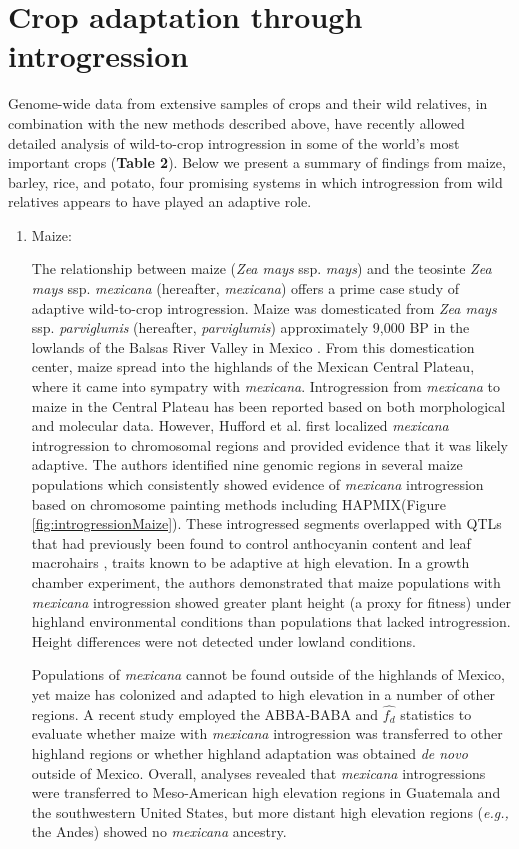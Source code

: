 \documentclass[11pt]{article}
\begin{document}
\section*{Crop adaptation through introgression}

Genome-wide data from extensive samples of crops and their wild relatives, in combination with the new methods described above, have recently allowed detailed analysis of wild-to-crop introgression in some of the world's most important crops (\textbf{Table 2}).
Below we present a summary of findings from maize, barley, rice, and potato, four promising systems in which introgression from wild relatives appears to have played an adaptive role.

\begin{enumerate}
\item{Maize:}

The relationship between maize (\emph{Zea mays} ssp. \emph{mays}) and the teosinte \emph{Zea mays} ssp. \emph{mexicana} (hereafter, \emph{mexicana}) offers a prime case study of adaptive wild-to-crop introgression.
Maize was domesticated from \emph{Zea mays} ssp. \emph{parviglumis} (hereafter, \emph{parviglumis})  approximately 9,000 BP in the lowlands of the Balsas River Valley in Mexico \cite{matsuoka2002single}.
From this domestication center, maize spread into the highlands of the Mexican Central Plateau, where it came into sympatry with \emph{mexicana}.
Introgression from \emph{mexicana} to maize in the Central Plateau has been reported based on both morphological \cite {wilkes1977} and molecular \cite{vanHeerwaarden2011, doebley1987} data.
However, Hufford et al. \cite{Hufford2013} first localized \emph{mexicana} introgression to chromosomal regions and provided evidence that it was likely adaptive.
The authors identified nine genomic regions in several maize populations which consistently showed evidence of \emph{mexicana} introgression based on chromosome painting methods including HAPMIX(Figure \ref{fig:introgressionMaize}).
These introgressed segments overlapped with QTLs that had previously been found to control anthocyanin content and leaf macrohairs \cite{lauter2004}, traits known to be adaptive at high elevation.
In a growth chamber experiment, the authors demonstrated that maize populations with \emph{mexicana} introgression showed greater plant height (a proxy for fitness) under highland environmental conditions than populations that lacked introgression.
Height differences were not detected under lowland conditions.


Populations of \emph{mexicana} cannot be found outside of the highlands of Mexico, yet maize has colonized and adapted to high elevation in a number of other regions.
A recent study \cite{wang2017} employed the ABBA-BABA and $\hat{f_{d}}$ statistics to evaluate whether maize with \emph{mexicana} introgression was transferred to other highland regions or whether highland adaptation was obtained \emph{de novo} outside of Mexico.
Overall, analyses revealed that  \emph{mexicana} introgressions were transferred to Meso-American high elevation regions in Guatemala and the southwestern United States, but more distant high elevation regions (\emph{e.g.,} the Andes) showed no \emph{mexicana} ancestry. 


\end{enumerate}
\end{document}
